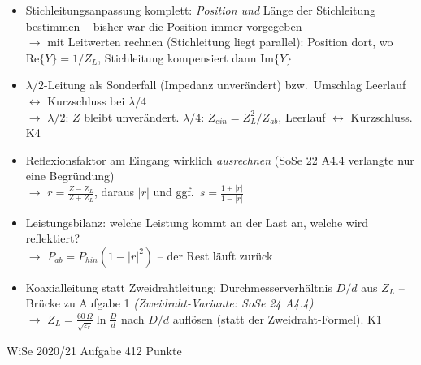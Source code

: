 \documentclass[a4paper,10pt]{article}
\newcommand{\marke}[1]{\markboth{#1}{#1}}
\newcommand{\aufgabenkopf}[3]{%
  \par\vspace{1mm}
  \noindent\colorbox{#3}{\parbox{\dimexpr\textwidth-2\fboxsep}{%
    \color{white}\sffamily\bfseries\strut\hspace{1mm}#1\hfill#2\hspace{1mm}}}%
  \par\vspace{2.5mm}}
\begin{document}
\begin{tcolorbox}[colback=A4Farbe!4, colframe=A4Farbe!55, boxrule=0.5pt, arc=1mm, left=3mm, right=2mm, top=2mm, bottom=2mm, breakable, title={\sffamily\bfseries\small Was diesmal neu drankommen könnte \normalfont\itshape\footnotesize -- eigene Prognose (keine offizielle Ankündigung): Umkehrungen, Kombinationen und Transfers zwischen den Aufgabentypen}, coltitle=white, colbacktitle=A4Farbe!70]
\sffamily\small
\begin{itemize}\setlength{\itemsep}{2.2mm}\setlength{\leftmargini}{4mm}
\item Stichleitungsanpassung komplett: \emph{Position und} Länge der Stichleitung bestimmen -- bisher war die Position immer vorgegeben\\[0.6mm] {\footnotesize\color{A4Farbe}$\rightarrow$ mit Leitwerten rechnen (Stichleitung liegt parallel): Position dort, wo $\mathrm{Re}\{Y\}=1/Z_L$, Stichleitung kompensiert dann $\mathrm{Im}\{Y\}$}
\item $\lambda/2$-Leitung als Sonderfall (Impedanz unverändert) bzw.\ Umschlag Leerlauf $\leftrightarrow$ Kurzschluss bei $\lambda/4$\\[0.6mm] {\footnotesize\color{A4Farbe}$\rightarrow$ $\lambda/2$: $Z$ bleibt unverändert. $\lambda/4$: $Z_{ein}=Z_L^2/Z_{ab}$, Leerlauf $\leftrightarrow$ Kurzschluss. K4}
\item Reflexionsfaktor am Eingang wirklich \emph{ausrechnen} (SoSe 22 A4.4 verlangte nur eine Begründung)\\[0.6mm] {\footnotesize\color{A4Farbe}$\rightarrow$ $r=\frac{Z-Z_L}{Z+Z_L}$, daraus $|r|$ und ggf.\ $s=\frac{1+|r|}{1-|r|}$}
\item Leistungsbilanz: welche Leistung kommt an der Last an, welche wird reflektiert?\\[0.6mm] {\footnotesize\color{A4Farbe}$\rightarrow$ $P_{ab}=P_{hin}(1-|r|^2)$ -- der Rest läuft zurück}
\item Koaxialleitung statt Zweidrahtleitung: Durchmesserverhältnis $D/d$ aus $Z_L$ -- Brücke zu Aufgabe 1 \textcolor{Grau}{\itshape(Zweidraht-Variante: SoSe 24 A4.4)}\\[0.6mm] {\footnotesize\color{A4Farbe}$\rightarrow$ $Z_L=\frac{60\,\Omega}{\sqrt{\varepsilon_r}}\ln\frac{D}{d}$ nach $D/d$ auflösen (statt der Zweidraht-Formel). K1}
\end{itemize}\end{tcolorbox}
\clearpage
\Needspace*{182.0mm}
\marke{\color{A4Farbe}A4 \textendash{} WiSe 2020/21}
\label{auf:WiSe20x21:4}
\aufgabenkopf{WiSe 2020/21 \textendash{} Aufgabe 4}{12 Punkte}{A4Farbe}
\end{document}
